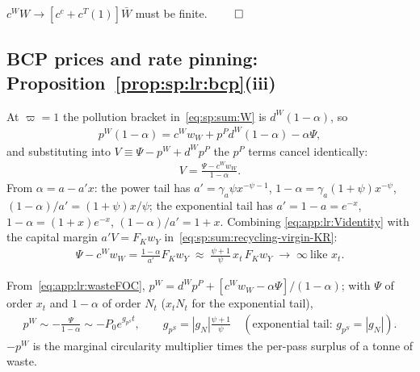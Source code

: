  $c^WW\to\left[c^c+c^T(1)\right]\bar W$ must be finite. \hfill$\qed$

\subsection{BCP prices and rate pinning: Proposition~\ref{prop:sp:lr:bcp}(iii)}
\label{sec:app:longrun:prices}

 At $\varpi=1$ the pollution bracket
in~\eqref{eq:sp:sum:W} is $d^W\left(1-\alpha\right)$, so
\begin{align}
p^W\left(1-\alpha\right)=c^Ww_W+p^Pd^W\left(1-\alpha\right)-\alpha\Psi ,
\label{eq:app:lr:wasteFOC}
\end{align}
and substituting into $V\equiv\Psi-p^W+d^Wp^P$ the $p^P$ terms cancel identically:
\begin{align}
V=\frac{\Psi-c^Ww_W}{1-\alpha}.
\label{eq:app:lr:Videntity}
\end{align}
From $\alpha=a-a'x$: the power tail has $a'=\gamma_a\psi x^{-\psi-1}$,
$1-\alpha=\gamma_a\left(1+\psi\right)x^{-\psi}$,
$\left(1-\alpha\right)/a'=\left(1+\psi\right)x/\psi$; the exponential tail has $a'=1-a=e^{-x}$,
$1-\alpha=\left(1+x\right)e^{-x}$, $\left(1-\alpha\right)/a'=1+x$. Combining
\eqref{eq:app:lr:Videntity} with the capital margin $a'V=F_Kw_Y$
in~\eqref{eq:sp:sum:recycling-virgin-KR}:
\begin{align}
\Psi-c^Ww_W=\frac{1-\alpha}{a'}F_Kw_Y\;\approx\;\frac{\psi+1}{\psi}\,x_t\,F_Kw_Y
\;\longrightarrow\;\infty\ \text{like }x_t .
\label{eq:app:lr:identity}
\end{align}

 From~\eqref{eq:app:lr:wasteFOC},
$p^W=d^Wp^P+\left[c^Ww_W-\alpha\Psi\right]/\left(1-\alpha\right)$; with $\Psi$ of order $x_t$
and $1-\alpha$ of order $N_t$ ($x_tN_t$ for the exponential tail),
\begin{align}
p^W\sim-\frac{\Psi}{1-\alpha}\sim-P_0e^{g_{p^S}t},
\qquad
g_{p^S}=\left|g_N\right|\frac{\psi+1}{\psi}
\quad\left(\text{exponential tail: }g_{p^S}=\left|g_N\right|\right).
\label{eq:app:lr:pW}
\end{align}
$-p^W$ is the marginal circularity multiplier times the per-pass surplus of a tonne of waste.

